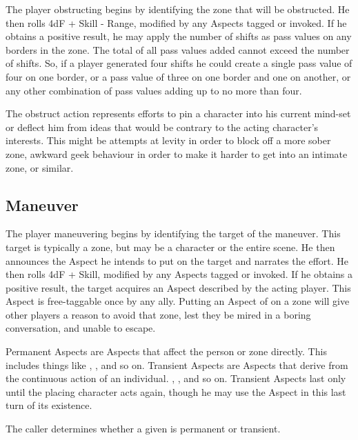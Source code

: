 The player obstructing begins by identifying the zone that will be obstructed. He then rolls 4dF + Skill - Range, modified by any Aspects tagged or invoked. If he obtains a positive result, he may apply the number of shifts as pass values on any borders in the zone. The total of all pass values added cannot exceed the number of shifts. So, if a player generated four shifts he could create a single pass value of four on one border, or a pass value of three on one border and one on another, or any other combination of pass values adding up to no more than four.

The obstruct action represents efforts to pin a character into his current mind-set or deflect him from ideas that would be contrary to the acting character's interests. This might be attempts at levity in order to block off a more sober zone, awkward geek behaviour in order to make it harder to get into an intimate zone, or similar.

\vfil

\subsection{Maneuver}\label{sec:Maneuver}

The player maneuvering begins by identifying the target of the maneuver. This target is typically a zone, but may be a character or the entire scene. He then announces the Aspect he intends to put on  the target and narrates the effort. He then rolls 4dF + Skill, modified by any Aspects tagged or invoked. If he obtains a positive result, the target acquires an Aspect described by the acting player. This Aspect is free-taggable once by any ally. Putting an Aspect of  on a zone will give other players a reason to avoid that zone, lest they be mired in a boring conversation, and unable to escape.

Permanent Aspects are Aspects that affect the person or zone directly. This includes things like , , and so on. Transient Aspects are Aspects that derive from the continuous action of an individual. , , and so on. Transient Aspects last only until the placing character acts again, though he may use the Aspect in this last turn of its existence.

The caller determines whether a given \Aspect{} is permanent or transient.



